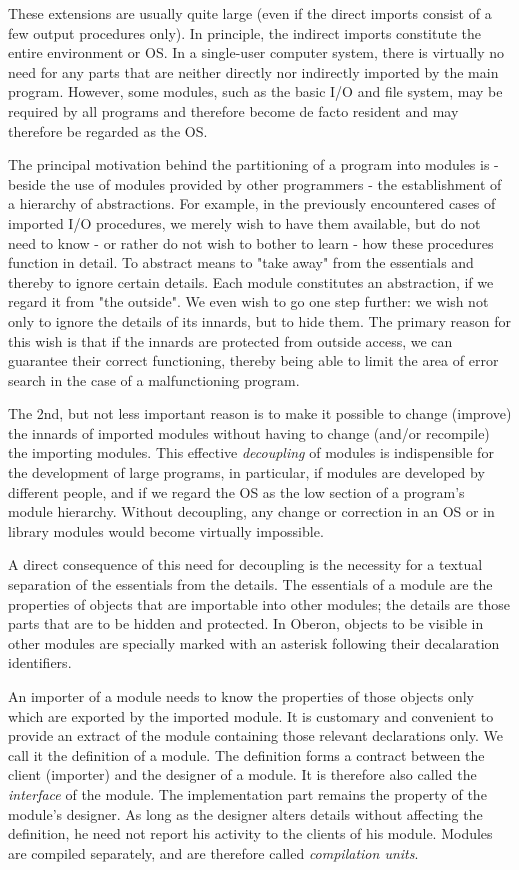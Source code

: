 These extensions are usually quite large (even if the direct imports consist of a few output
procedures only). In principle, the indirect imports constitute the entire environment or OS.
In a single-user computer system, there is virtually no need for any parts that are neither
directly nor indirectly imported by the main program. However, some modules, such as the
basic I/O and file system, may be required by all programs and therefore become de facto
resident and may therefore be regarded as the OS.

The principal motivation behind the partitioning of a program into modules is - beside the use of
modules provided by other programmers - the establishment of a hierarchy of abstractions. For
example, in the previously encountered cases of imported I/O procedures, we merely wish
to have them available, but do not need to know - or rather do not wish to bother to learn - how
these procedures function in detail. To abstract means to "take away" from the essentials and
thereby to ignore certain details. Each module constitutes an abstraction, if we regard it from "the
outside". We even wish to go one step further: we wish not only to ignore the details of its innards,
but to hide them. The primary reason for this wish is that if the innards are protected from outside
access, we can guarantee their correct functioning, thereby being able to limit the area of error
search in the case of a malfunctioning program.

The 2nd, but not less important reason is to make it possible to change (improve) the innards of
imported modules without having to change (and/or recompile) the importing modules. This effective
\emph{decoupling} of modules is indispensible for the development of large programs, in particular,
if modules are developed by different people, and if we regard the OS as the low section of a
program's module hierarchy. Without decoupling, any change or correction in an OS or in library
modules would become virtually impossible.

A direct consequence of this need for decoupling is the necessity for a textual separation of the
essentials from the details. The essentials of a module are the properties of objects that are
importable into other modules; the details are those parts that are to be hidden and protected.
In Oberon, objects to be visible in other modules are specially marked with an asterisk
following their decalaration identifiers.

An importer of a module needs to know the properties of those objects only which are exported by
the imported module. It is customary and convenient to provide an extract of the module containing
those relevant declarations only. We call it the definition of a module. The definition forms a
contract between the client (importer) and the designer of a module. It is therefore also called the
\emph{interface} of the module. The implementation part remains the property of the module's designer.
As long as the designer alters details without affecting the definition, he need not report his
activity to the clients of his module. Modules are compiled separately, and are therefore called
\emph{compilation units}.

